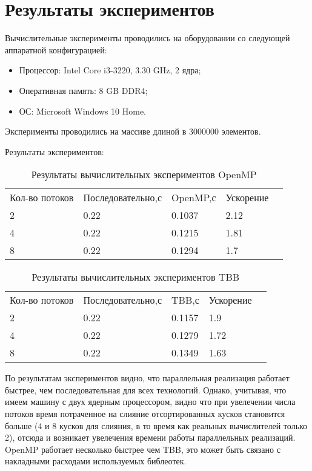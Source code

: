 \documentclass{report}
\begin{document}
\newpage

\section*{Результаты экспериментов}
Вычислительные эксперименты проводились на оборудовании со следующей аппаратной конфигурацией:

\begin{itemize}
\item Процессор: Intel Core i3-3220, 3.30 GHz, 2 ядра;
\item Оперативная память: 8 GB DDR4;
\item ОС: Microsoft Windows 10 Home.
\end{itemize}

\par Эксперименты проводились на массиве длиной в 3000000 элементов. 
\par Результаты экспериментов:
\begin{table}[!h]
\centering
\begin{tabular}{lllll}
Кол-во потоков & Последовательно,с & OpenMP,с & Ускорение  \\
2 & 0.22 & 0.1037 & 2.12  \\
4 & 0.22 & 0.1215 & 1.81  \\
8 & 0.22 & 0.1294 & 1.7 
\end{tabular}
\caption{Результаты вычислительных экспериментов OpenMP}
\end{table}

\begin{table}[!h]
\centering
\begin{tabular}{lllll}
Кол-во потоков & Последовательно,с & TBB,с & Ускорение  \\
2 & 0.22 & 0.1157 & 1.9  \\
4 & 0.22 & 0.1279 & 1.72  \\
8 & 0.22 & 0.1349 & 1.63 
\end{tabular}
\caption{Результаты вычислительных экспериментов TBB}
\end{table}


\par По результатам экспериментов видно, что параллельная реализация работает быстрее, чем последовательная для всех технологий. Однако, учитывая, что имеем машину с двух ядерным процессором, видно что при увелечении числа потоков время потраченное на слияние отсортированных кусков становится больше (4 и 8 кусков для слияния, в то время как реальных вычислителей только 2), отсюда и возникает увелечения времени работы параллельных реализаций. OpenMP работает несколько быстрее чем TBB, это может быть связано с накладными расходами используемых библеотек.
\end{document}
